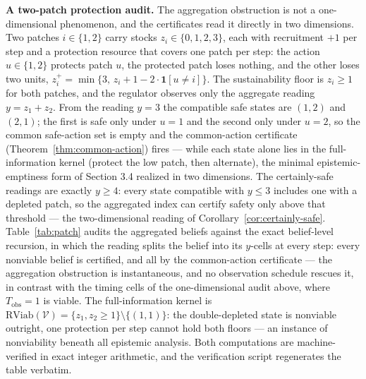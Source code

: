 \documentclass[10pt,twocolumn]{article}
\theoremstyle{definition}
\begin{document}
\textbf{A two-patch protection audit.} The aggregation obstruction is not a one-dimensional phenomenon, and the certificates read it directly in two dimensions. Two patches \(i \in \{1,2\}\) carry stocks \(z_{i} \in \{0,1,2,3\}\), each with recruitment \(+1\) per step and a protection resource that covers one patch per step: the action \(u \in \{1,2\}\) protects patch \(u\), the protected patch loses nothing, and the other loses two units, \(z_{i}^{+} = \min\{3,\, z_{i} + 1 - 2\cdot \mathbf{1}[u \neq i]\}\). The sustainability floor is \(z_{i} \ge 1\) for both patches, and the regulator observes only the aggregate reading \(y = z_{1} + z_{2}\). From the reading \(y = 3\) the compatible safe states are \((1,2)\) and \((2,1)\); the first is safe only under \(u = 1\) and the second only under \(u = 2\), so the common safe-action set is empty and the common-action certificate (Theorem~\ref{thm:common-action}) fires --- while each state alone lies in the full-information kernel (protect the low patch, then alternate), the minimal epistemic-emptiness form of Section 3.4 realized in two dimensions. The certainly-safe readings are exactly \(y \ge 4\): every state compatible with \(y \le 3\) includes one with a depleted patch, so the aggregated index can certify safety only above that threshold --- the two-dimensional reading of Corollary~\ref{cor:certainly-safe}. Table~\ref{tab:patch} audits the aggregated beliefs against the exact belief-level recursion, in which the reading splits the belief into its \(y\)-cells at every step: every nonviable belief is certified, and all by the common-action certificate --- the aggregation obstruction is instantaneous, and no observation schedule rescues it, in contrast with the timing cells of the one-dimensional audit above, where \(T_{\mathrm{obs}} = 1\) is viable. The full-information kernel is \(\mathrm{RViab}(\mathcal{V}) = \{z_{1}, z_{2} \ge 1\} \setminus \{(1,1)\}\): the double-depleted state is nonviable outright, one protection per step cannot hold both floors --- an instance of nonviability beneath all epistemic analysis. Both computations are machine-verified in exact integer arithmetic, and the verification script regenerates the table verbatim.
\end{document}

